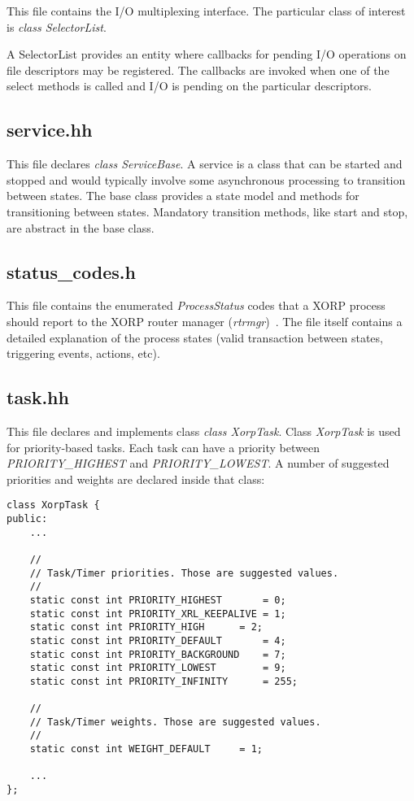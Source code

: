 \documentclass[11pt]{article}
\begin{document}
This file contains the I/O multiplexing interface. The particular class
of interest is \emph{class SelectorList}.

A SelectorList provides an entity where callbacks for pending I/O
operations on file descriptors may be registered.  The callbacks
are invoked when one of the select methods is called and I/O
is pending on the particular descriptors.

\subsection{service.hh}

This file declares \emph{class ServiceBase}.  A service is a class that
can be started and stopped and would typically involve some asynchronous
processing to transition between states.  The base class provides a
state model and methods for transitioning between states.  Mandatory
transition methods, like start and stop, are abstract in the base
class.

\subsection{status\_codes.h}

This file contains the enumerated \emph{ProcessStatus} codes
that a XORP process should report to the XORP router manager
(\emph{rtrmgr})~\cite{xorp:rtrmgr}.
The file itself contains a detailed explanation of the process states
(valid transaction between states, triggering events, actions, etc).

\subsection{task.hh}
\label{sec:task_hh}

This file declares and implements class \emph{class XorpTask}.
Class \emph{XorpTask} is used for priority-based tasks.
Each task can have a priority between \emph{PRIORITY\_HIGHEST} and
\emph{PRIORITY\_LOWEST}. A number of suggested priorities and weights
are declared inside that class:

\begin{verbatim}
class XorpTask {
public:
    ...

    //
    // Task/Timer priorities. Those are suggested values.
    //
    static const int PRIORITY_HIGHEST		= 0;
    static const int PRIORITY_XRL_KEEPALIVE	= 1;
    static const int PRIORITY_HIGH		= 2;
    static const int PRIORITY_DEFAULT		= 4;
    static const int PRIORITY_BACKGROUND	= 7;
    static const int PRIORITY_LOWEST		= 9;
    static const int PRIORITY_INFINITY		= 255;

    //
    // Task/Timer weights. Those are suggested values.
    //
    static const int WEIGHT_DEFAULT		= 1;

    ...
};

\end{verbatim}
\end{document}
